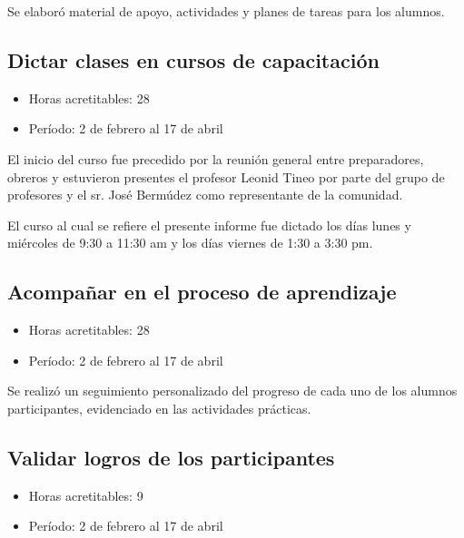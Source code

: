                 Se elaboró material de apoyo, actividades y planes de tareas para los alumnos.
                
             \subsection {Dictar clases en cursos de capacitación}
             \begin{itemize}
                 \item Horas acretitables: 28
                 \item Período: 2 de febrero al 17 de abril
                \end{itemize}
                
                El inicio del curso fue precedido por la reunión general entre preparadores, obreros y estuvieron presentes el profesor Leonid Tineo por parte del grupo de profesores y el sr. José Bermúdez como representante de la comunidad.
                
                El curso al cual se refiere el presente informe fue dictado los días lunes y miércoles de 9:30 a 11:30 am y los días viernes de 1:30 a 3:30 pm.
                
             \subsection {Acompañar en el proceso de aprendizaje}
             \begin{itemize}
                 \item Horas acretitables: 28
                 \item Período: 2 de febrero al 17 de abril
                \end{itemize}
                
                Se realizó un seguimiento personalizado del progreso de cada uno de los alumnos participantes, evidenciado en las actividades prácticas.
                
             \subsection {Validar logros de los participantes}
             \begin{itemize}
                 \item Horas acretitables: 9
                 \item Período: 2 de febrero al 17 de abril
                \end{itemize}
                
